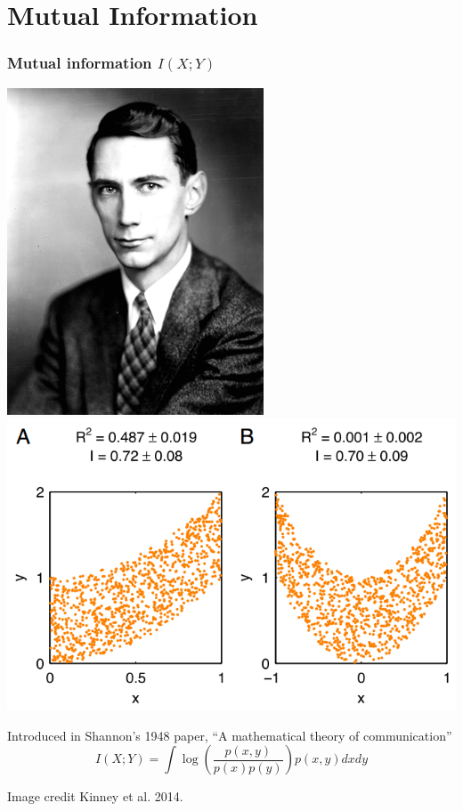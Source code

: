 \documentclass{beamer}
\begin{document}
\section{Mutual Information}

\begin{frame}
\sectionpage
\end{frame}

\begin{frame}
\frametitle{Mutual information $I(X; Y)$}
\begin{center}
\includegraphics[scale = 0.23]{shannon_claude.png}
\hspace{0.2in}
\includegraphics[scale = 0.2]{kinney2.png}
\end{center}
Introduced in Shannon's 1948 paper, ``A mathematical theory of communication''
\[
I(X; Y) = \int \log \left(\frac{p(x, y)}{p(x)p(y)}\right) p(x, y) dx dy
\]

\vspace{0.2in}
\tiny{Image credit Kinney et al. 2014.}
\end{frame}
\end{document}

